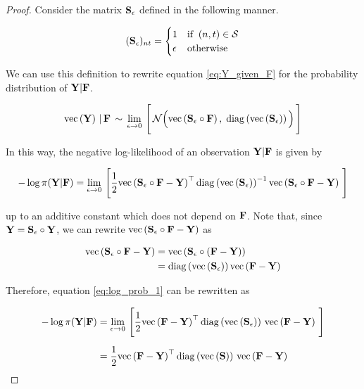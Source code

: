 \begin{proof}
    Consider the matrix $\mathbf{S}_{\epsilon}$ defined in the following manner. 
    
    \begin{equation}
        (\mathbf{S}_{\epsilon})_{nt} = \begin{cases}
            1 & \text{if} \;\; (n, t) \in \mathcal{S} \\
            \epsilon & \text{otherwise}
        \end{cases}
    \end{equation}

    We can use this definition to rewrite equation \ref{eq:Y_given_F} for the probability distribution of $\mathbf{Y} | \mathbf{F}$.

    \begin{equation}
        \text{\textup{vec}}\left(\mathbf{Y}\right) \, | \, \mathbf{F} \, \sim \, \lim_{\epsilon \rightarrow 0} \, \Bigg[ \, \mathcal{N}\Big(\text{\textup{vec}}\left(\mathbf{S}_{\epsilon} \circ \mathbf{F}\right), \; \text{\textup{diag}}\left(\text{\textup{vec}}\left(\mathbf{S}_{\epsilon}\right)\right)\Big) \, \Bigg]
    \end{equation}

    In this way, the negative log-likelihood of an observation $\mathbf{Y} | \mathbf{F}$ is given by 

    \begin{equation}
        \label{eq:log_prob_1}
        - \log \pi(\Y | \F) = \lim_{\epsilon \rightarrow 0} \, \Bigg[  \frac{1}{2} \vecc{\Ss_{\epsilon} \circ \F - \Y}^\top \diag{\vecc{\Ss_{\epsilon}}}^{-1} \vecc{\Ss_{\epsilon} \circ \F - \Y}\, \Bigg]
    \end{equation}

    up to an additive constant which does not depend on $\mathbf{F}$. Note that, since $\mathbf{Y} = \mathbf{S}_{\epsilon}  \circ \mathbf{Y}$, we can rewrite $\text{\textup{vec}}\left(\mathbf{S}_{\epsilon} \circ \mathbf{F} - \mathbf{Y}\right)$ as 

    \begin{align}
        \text{\textup{vec}}\left(\mathbf{S}_{\epsilon} \circ \mathbf{F} - \mathbf{Y}\right) &= \text{\textup{vec}}\left(\mathbf{S}_{\epsilon} \circ  (\mathbf{F} - \mathbf{Y})\right)  \notag \\
        &= \text{\textup{diag}}\left(\text{\textup{vec}}\left(\mathbf{S}_{\epsilon}\right)\right) \text{\textup{vec}}\left(\mathbf{F} - \mathbf{Y}\right)
    \end{align}

    Therefore, equation \ref{eq:log_prob_1} can be rewritten as 

    \begin{align}
        - \log \pi(\mathbf{Y} | \mathbf{F}) &= \lim_{\epsilon \rightarrow 0} \, \Bigg[  \frac{1}{2} \text{\textup{vec}}\left(\mathbf{F} - \mathbf{Y}\right)^\top \text{\textup{diag}}\left(\text{\textup{vec}}\left(\mathbf{S}_{\epsilon}\right)\right) \, \text{\textup{vec}}\left(\mathbf{F} - \mathbf{Y}\right)\, \Bigg] \notag \\[0.2cm]
        &= \frac{1}{2} \text{\textup{vec}}\left(\mathbf{F} - \mathbf{Y}\right)^\top \text{\textup{diag}}\left(\text{\textup{vec}}\left(\mathbf{S}\right)\right) \, \text{\textup{vec}}\left(\mathbf{F} - \mathbf{Y}\right)
    \end{align}


\end{proof}
